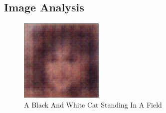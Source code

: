 \documentclass{article}%
\begin{document}
%
\subsection{Image Analysis}%
\label{subsec:ImageAnalysis}%


\begin{figure}[h!]%
\centering%
\includegraphics[width=150px]{500_fake_images/samples_5_20.png}%
\caption{A Black And White Cat Standing In A Field}%
\end{figure}

%
\end{document}
